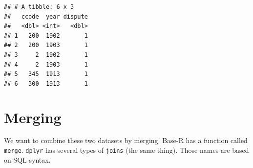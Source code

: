 \documentclass[
]{book}
\newenvironment{Shaded}{\begin{snugshade}}{\end{snugshade}}
\newcommand{\CommentTok}[1]{\textcolor[rgb]{0.56,0.35,0.01}{\textit{#1}}}
\newcommand{\ControlFlowTok}[1]{\textcolor[rgb]{0.13,0.29,0.53}{\textbf{#1}}}
\newcommand{\DataTypeTok}[1]{\textcolor[rgb]{0.13,0.29,0.53}{#1}}
\newcommand{\DecValTok}[1]{\textcolor[rgb]{0.00,0.00,0.81}{#1}}
\newcommand{\KeywordTok}[1]{\textcolor[rgb]{0.13,0.29,0.53}{\textbf{#1}}}
\newcommand{\NormalTok}[1]{#1}
\newcommand{\OperatorTok}[1]{\textcolor[rgb]{0.81,0.36,0.00}{\textbf{#1}}}
\newcommand{\StringTok}[1]{\textcolor[rgb]{0.31,0.60,0.02}{#1}}
\theoremstyle{definition}
\theoremstyle{definition}
\theoremstyle{definition}
\theoremstyle{remark}
\begin{document}
\begin{Shaded}
\end{Shaded}

\begin{verbatim}
## # A tibble: 6 x 3
##   ccode  year dispute
##   <dbl> <int>   <dbl>
## 1   200  1902       1
## 2   200  1903       1
## 3     2  1902       1
## 4     2  1903       1
## 5   345  1913       1
## 6   300  1913       1
\end{verbatim}

\hypertarget{merging}{%
\section{Merging}\label{merging}}

We want to combine these two datasets by merging. Base-R has a function called \texttt{merge}. \texttt{dplyr} has several types of \texttt{joins} (the same thing). Those names are based on SQL syntax.
\end{document}

